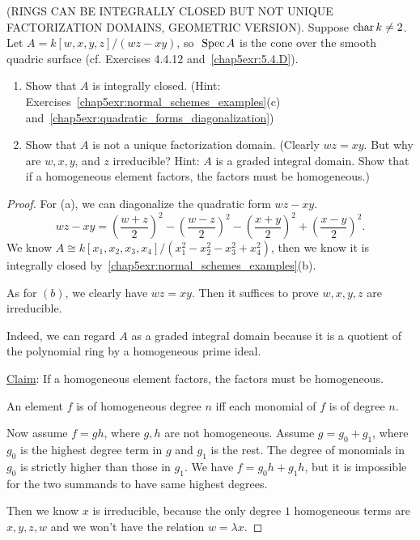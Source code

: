 \documentclass[11pt]{book} %
\begin{document}
\begin{exr}
(RINGS CAN BE INTEGRALLY CLOSED BUT NOT UNIQUE FACTORIZATION DOMAINS, GEOMETRIC VERSION). Suppose $\text{char\,} k \neq 2$. Let $A = k[w, x, y, z]/(wz - xy)$, so $\text{ Spec\,} A$ is the cone over the smooth quadric surface (cf. Exercises 4.4.12 and~\ref{chap5exr:5.4.D}).
\begin{enumerate}[label=(\alph*)]
\item Show that $A$ is integrally closed. (Hint: Exercises~\ref{chap5exr:normal_schemes_examples}(c) and~\ref{chap5exr:quadratic_forms_diagonalization})
\item Show that $A$ is not a unique factorization domain. (Clearly $wz = xy$. But why are $w, x, y$, and $z$ irreducible? Hint: $A$ is a graded integral domain. Show that if a homogeneous element factors, the factors must be homogeneous.)
\end{enumerate}
\end{exr}
\begin{proof}
For (a), we can diagonalize the quadratic form $wz-xy$.
$$
wz-xy=\left(\frac{w+z}{2}\right)^2-\left(\frac{w-z}{2}\right)^2-\left(\frac{x+y}{2}\right)^2+\left(\frac{x-y}{2}\right)^2.
$$
We know $A\cong k[x_1,x_2,x_3,x_4]/(x_1^2-x_2^2-x_3^2+x_4^2)$, then we know it is integrally closed by~\ref{chap5exr:normal_schemes_examples}(b).

As for $(b)$, we clearly have $wz=xy$. Then it suffices to prove $w,x,y,z$ are irreducible.  

Indeed, we can regard $A$ as a graded integral domain because it is a quotient of the polynomial ring by a homogeneous prime ideal. 

\underline{Claim}: If a homogeneous element factors, the factors must be homogeneous. 

An element $f$ is of homogeneous degree $n$ iff each monomial of $f$ is of degree $n$.

Now assume $f=gh$, where $g,h$ are not homogeneous. Assume $g=g_{0}+g_1$, where $g_0$ is the highest degree term in $g$ and $g_1$ is the rest. The degree of monomials in $g_0$ is strictly higher than those in $g_1$. We have $f=g_0 h+g_1 h$, but it is impossible for the two summands to have same highest degrees.

Then we know $x$ is irreducible, because the only degree 
$1$ homogeneous terms are $x,y,z,w$ and we won't have the relation $w=\lambda x$. 
\end{proof}
\end{document}

